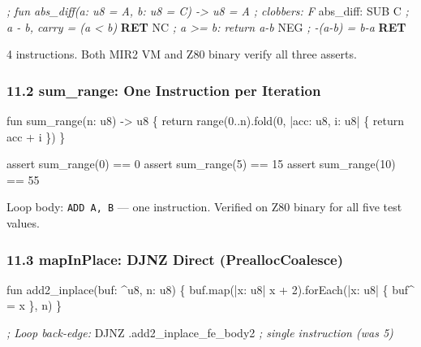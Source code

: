 \documentclass[
  11pt,
]{article}
\newenvironment{Shaded}{}{}
\newcommand{\BuiltInTok}[1]{\textcolor[rgb]{0.00,0.50,0.00}{#1}}
\newcommand{\CommentTok}[1]{\textcolor[rgb]{0.38,0.63,0.69}{\textit{#1}}}
\newcommand{\ControlFlowTok}[1]{\textcolor[rgb]{0.00,0.44,0.13}{\textbf{#1}}}
\newcommand{\FunctionTok}[1]{\textcolor[rgb]{0.02,0.16,0.49}{#1}}
\newcommand{\NormalTok}[1]{#1}
\newcommand{\OperatorTok}[1]{\textcolor[rgb]{0.40,0.40,0.40}{#1}}
\begin{document}
\begin{Shaded}
\begin{Highlighting}[]
\CommentTok{; fun abs\_diff(a: u8 = A, b: u8 = C) {-}\textgreater{} u8 = A ; clobbers: F}
\FunctionTok{abs\_diff:}
    \BuiltInTok{SUB}\NormalTok{ C       }\CommentTok{; a {-} b, carry = (a \textless{} b)}
    \ControlFlowTok{RET}\NormalTok{ NC      }\CommentTok{; a \textgreater{}= b: return a{-}b}
    \BuiltInTok{NEG}         \CommentTok{; {-}(a{-}b) = b{-}a}
    \ControlFlowTok{RET}
\end{Highlighting}
\end{Shaded}

4 instructions. Both MIR2 VM and Z80 binary verify all three asserts.

\subsubsection{11.2 sum\_range: One Instruction per
Iteration}\label{sum_range-one-instruction-per-iteration}

\begin{Shaded}
\begin{Highlighting}[]
\NormalTok{fun sum\_range(n: u8) {-}\textgreater{} u8 \{}
\NormalTok{    return range(0..n).fold(0, |acc: u8, i: u8| \{ return acc + i \})}
\NormalTok{\}}

\NormalTok{assert sum\_range(0)  == 0}
\NormalTok{assert sum\_range(5)  == 15}
\NormalTok{assert sum\_range(10) == 55}
\end{Highlighting}
\end{Shaded}

Loop body: \texttt{ADD\ A,\ B} --- one instruction. Verified on Z80
binary for all five test values.

\subsubsection{11.3 mapInPlace: DJNZ Direct
(PreallocCoalesce)}\label{mapinplace-djnz-direct-prealloccoalesce}

\begin{Shaded}
\begin{Highlighting}[]
\NormalTok{fun add2\_inplace(buf: \^{}u8, n: u8) \{}
\NormalTok{    buf.map(|x: u8| x + 2).forEach(|x: u8| \{ buf\^{} = x \}, n)}
\NormalTok{\}}
\end{Highlighting}
\end{Shaded}

\begin{Shaded}
\begin{Highlighting}[]
\CommentTok{; Loop back{-}edge:}
\NormalTok{    DJNZ }\OperatorTok{.}\NormalTok{add2\_inplace\_fe\_body2    }\CommentTok{; single instruction (was 5)}
\end{Highlighting}
\end{Shaded}
\end{document}
